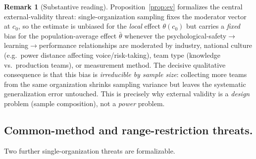 \documentclass{amsart}
\theoremstyle{definition}
\newtheorem{remark}{Remark}
\begin{document}
\begin{remark}[Substantive reading]
Proposition~\ref{prop:ev} formalizes the central external-validity threat:
single-organization sampling fixes the moderator vector at $c_0$, so the
estimate is unbiased for the \emph{local} effect $\theta(c_0)$ but carries a
\emph{fixed} bias for the population-average effect $\bar\theta$ whenever the
psychological-safety$\to$learning$\to$performance relationships are moderated
by industry, national culture (e.g.\ power distance affecting
voice/risk-taking), team type (knowledge vs.\ production teams), or
measurement method. The decisive qualitative consequence is that this bias
is \emph{irreducible by sample size}: collecting more teams from the same
organization shrinks sampling variance but leaves the systematic
generalization error untouched. This is precisely why external validity is a
\emph{design} problem (sample composition), not a \emph{power} problem.
\end{remark}

\subsection*{Common-method and range-restriction threats.}
Two further single-organization threats are formalizable.
\end{document}

